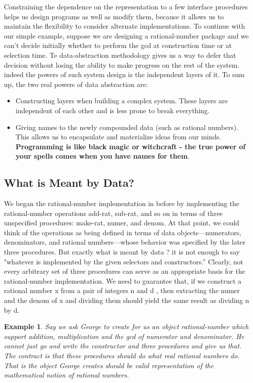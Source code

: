 \documentclass[a4paper,twoside]{article}
\newtheorem{example}[theorem]{Example}
\numberwithin{equation}{section}
\begin{document}
Constraining the dependence on the representation to a few interface procedures helps us design
programs as well as modify them, because it allows us to maintain the ﬂexibility to consider alternate
implementations. To continue with our simple example, suppose we
are designing a rational-number package and we can't decide initially whether to perform the gcd at
construction time or at selection time. Te data-abstraction methodology gives us a way to defer that
decision without losing the ability to make progress on the rest of the system. indeed the powers of
such system design is the independent layers of it. To sum up, the two real powers of data abstraction
are:
\begin{itemize}
    \item Constructing layers when building a complex system. These layers are independent of each other and is less prone to break everything.
    \item Giving names to the newly compounded data (such as rational numbers). This allows us to encapsulate and materialize ideas from our minds. \textbf{Programming is like black magic or witchcraft - the true power of your spells comes when you have names for them}.
\end{itemize}
\subsection{What is Meant by Data?}
We began the rational-number implementation in before by implementing the rational-number operations add-rat, sub-rat, and so on in terms of three unspecified procedures: make-rat, numer, and denom. At that point, we could think of the operations as being defined in terms of data objects—numerators, denominators, and rational numbers—whose behavior was specified by the later three procedures. But exactly what is meant by data ? it is not enough to say "whatever is implemented by the given selectors and constructors.” Clearly, not every arbitrary set of three procedures can serve as an appropriate basis for the rational-number implementation. We need to guarantee that, if we construct a rational number x from a pair of integers n and d , then extracting the numer and the denom of x and dividing them should yield the same result as dividing n by d.
\begin{example}
    Say we ask George to create for us an object rational-number which support addition, multiplication and
    the gcd of numerator and denominator. He cannot just go and write the constructor and three procedures and give us that.
    The contract is that these procedures should do what real rational numbers do.
    That is the object George creates should be valid representation of the mathematical notion of rational numbers.
\end{example}
\end{document}
